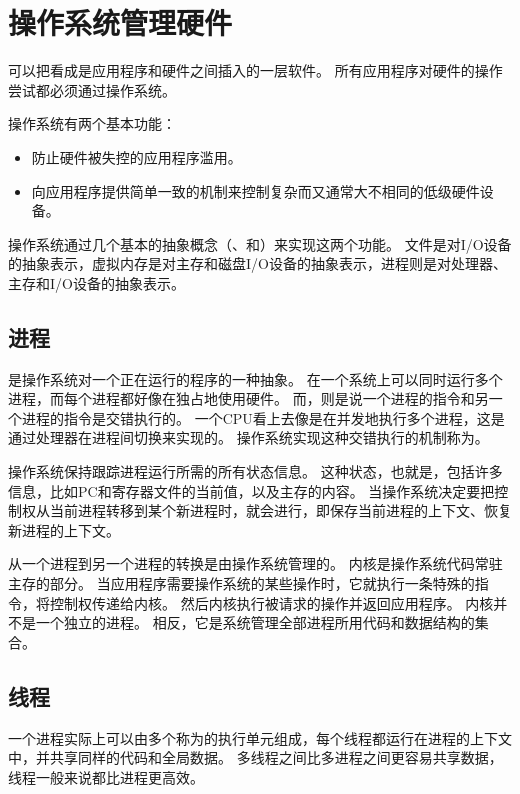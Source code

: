 
\section{操作系统管理硬件}
{
    可以把看成是应用程序和硬件之间插入的一层软件。
    所有应用程序对硬件的操作尝试都必须通过操作系统。

    操作系统有两个基本功能：

    \begin{itemize}
        \item 防止硬件被失控的应用程序滥用。
        \item 向应用程序提供简单一致的机制来控制复杂而又通常大不相同的低级硬件设备。
    \end{itemize}

    操作系统通过几个基本的抽象概念（、和）来实现这两个功能。
    文件是对I/O设备的抽象表示，虚拟内存是对主存和磁盘I/O设备的抽象表示，进程则是对处理器、主存和I/O设备的抽象表示。

    \subsection{进程}
    {
        是操作系统对一个正在运行的程序的一种抽象。
        在一个系统上可以同时运行多个进程，而每个进程都好像在独占地使用硬件。
        而，则是说一个进程的指令和另一个进程的指令是交错执行的。
        一个CPU看上去像是在并发地执行多个进程，这是通过处理器在进程间切换来实现的。
        操作系统实现这种交错执行的机制称为。

        操作系统保持跟踪进程运行所需的所有状态信息。
        这种状态，也就是，包括许多信息，比如PC和寄存器文件的当前值，以及主存的内容。
        当操作系统决定要把控制权从当前进程转移到某个新进程时，就会进行，即保存当前进程的上下文、恢复新进程的上下文。

        从一个进程到另一个进程的转换是由操作系统管理的。
        内核是操作系统代码常驻主存的部分。
        当应用程序需要操作系统的某些操作时，它就执行一条特殊的指令，将控制权传递给内核。
        然后内核执行被请求的操作并返回应用程序。
        内核并不是一个独立的进程。
        相反，它是系统管理全部进程所用代码和数据结构的集合。
    }

    \subsection{线程}
    {
        一个进程实际上可以由多个称为的执行单元组成，每个线程都运行在进程的上下文中，并共享同样的代码和全局数据。
        多线程之间比多进程之间更容易共享数据，线程一般来说都比进程更高效。
    }

}
